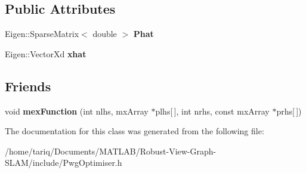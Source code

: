 \subsection*{Public Attributes}
\begin{DoxyCompactItemize}
\item 
Eigen\+::\+Sparse\+Matrix$<$ double $>$ {\bfseries Phat}\hypertarget{classPwgOptimiser_a4cae98998f37bc2806cfd8718b8c01cf}{}\label{classPwgOptimiser_a4cae98998f37bc2806cfd8718b8c01cf}

\item 
Eigen\+::\+Vector\+Xd {\bfseries xhat}\hypertarget{classPwgOptimiser_afb15930580a6bec1b31dd986120c825a}{}\label{classPwgOptimiser_afb15930580a6bec1b31dd986120c825a}

\end{DoxyCompactItemize}
\subsection*{Friends}
\begin{DoxyCompactItemize}
\item 
void {\bfseries mex\+Function} (int nlhs, mx\+Array $\ast$plhs\mbox{[}$\,$\mbox{]}, int nrhs, const mx\+Array $\ast$prhs\mbox{[}$\,$\mbox{]})\hypertarget{classPwgOptimiser_a6a215cbfde54f82a3ce599228fc3fce5}{}\label{classPwgOptimiser_a6a215cbfde54f82a3ce599228fc3fce5}

\end{DoxyCompactItemize}


The documentation for this class was generated from the following file\+:\begin{DoxyCompactItemize}
\item 
/home/tariq/\+Documents/\+M\+A\+T\+L\+A\+B/\+Robust-\/\+View-\/\+Graph-\/\+S\+L\+A\+M/include/Pwg\+Optimiser.\+h\end{DoxyCompactItemize}

